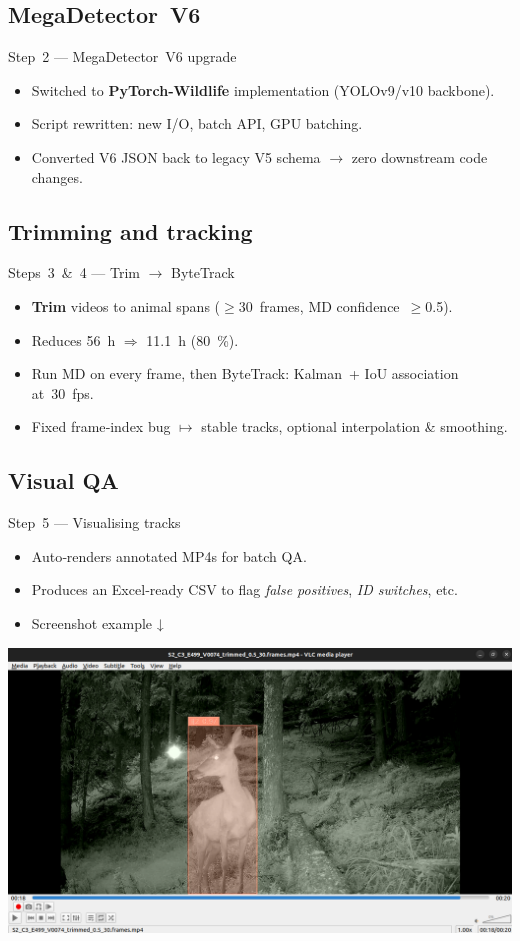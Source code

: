 \documentclass[aspectratio=169,xcolor=dvipsnames,t]{beamer}
\begin{document}
\subsection{MegaDetector V6}
\begin{frame}{Step 2 — MegaDetector V6 upgrade}
  \begin{itemize}
    \item Switched to \textbf{PyTorch‑Wildlife} implementation (YOLOv9/v10 backbone).
    \item Script rewritten: new I/O, batch API, GPU batching.
    \item Converted V6 JSON back to legacy V5 schema $\rightarrow$ zero downstream code changes.
  \end{itemize}
\end{frame}

\subsection{Trimming and tracking}
\begin{frame}{Steps 3 \& 4 — Trim $\rightarrow$ ByteTrack}
  \begin{itemize}
    \item \textbf{Trim} videos to animal spans ($\ge$30 frames, MD confidence $\ge$0.5).
    \item Reduces 56 h $\Rightarrow$ 11.1 h (80 \%).
    \item Run MD on every frame, then ByteTrack: Kalman + IoU association at 30 fps.
    \item Fixed frame‑index bug $\mapsto$ stable tracks, optional interpolation \& smoothing.
  \end{itemize}
\end{frame}

\subsection{Visual QA}
\begin{frame}{Step 5 — Visualising tracks}
  \begin{itemize}
    \item Auto‑renders annotated MP4s for batch QA.
    \item Produces an Excel‑ready CSV to flag \emph{false positives}, \emph{ID switches}, etc.
    \item Screenshot example ↓
  \end{itemize}
  \centering
  \includegraphics[width=.7\linewidth]{figs/vid.png}
\end{frame}
\end{document}
